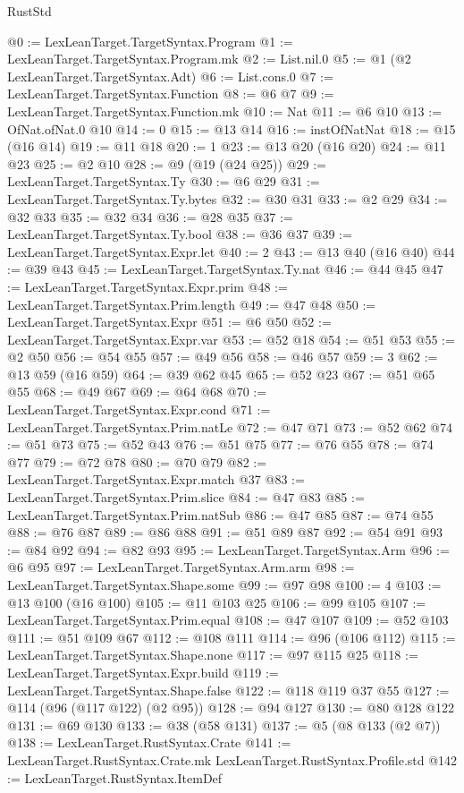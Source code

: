 \begin{lexlean}{RustStd}
\begin{coremodule}
@0 := LexLeanTarget.TargetSyntax.Program
@1 := LexLeanTarget.TargetSyntax.Program.mk
@2 := List.nil.{0}
@5 := @1 (@2 LexLeanTarget.TargetSyntax.Adt)
@6 := List.cons.{0}
@7 := LexLeanTarget.TargetSyntax.Function
@8 := @6 @7
@9 := LexLeanTarget.TargetSyntax.Function.mk
@10 := Nat
@11 := @6 @10
@13 := OfNat.ofNat.{0} @10
@14 := 0
@15 := @13 @14
@16 := instOfNatNat
@18 := @15 (@16 @14)
@19 := @11 @18
@20 := 1
@23 := @13 @20 (@16 @20)
@24 := @11 @23
@25 := @2 @10
@28 := @9 (@19 (@24 @25))
@29 := LexLeanTarget.TargetSyntax.Ty
@30 := @6 @29
@31 := LexLeanTarget.TargetSyntax.Ty.bytes
@32 := @30 @31
@33 := @2 @29
@34 := @32 @33
@35 := @32 @34
@36 := @28 @35
@37 := LexLeanTarget.TargetSyntax.Ty.bool
@38 := @36 @37
@39 := LexLeanTarget.TargetSyntax.Expr.let
@40 := 2
@43 := @13 @40 (@16 @40)
@44 := @39 @43
@45 := LexLeanTarget.TargetSyntax.Ty.nat
@46 := @44 @45
@47 := LexLeanTarget.TargetSyntax.Expr.prim
@48 := LexLeanTarget.TargetSyntax.Prim.length
@49 := @47 @48
@50 := LexLeanTarget.TargetSyntax.Expr
@51 := @6 @50
@52 := LexLeanTarget.TargetSyntax.Expr.var
@53 := @52 @18
@54 := @51 @53
@55 := @2 @50
@56 := @54 @55
@57 := @49 @56
@58 := @46 @57
@59 := 3
@62 := @13 @59 (@16 @59)
@64 := @39 @62 @45
@65 := @52 @23
@67 := @51 @65 @55
@68 := @49 @67
@69 := @64 @68
@70 := LexLeanTarget.TargetSyntax.Expr.cond
@71 := LexLeanTarget.TargetSyntax.Prim.natLe
@72 := @47 @71
@73 := @52 @62
@74 := @51 @73
@75 := @52 @43
@76 := @51 @75
@77 := @76 @55
@78 := @74 @77
@79 := @72 @78
@80 := @70 @79
@82 := LexLeanTarget.TargetSyntax.Expr.match @37
@83 := LexLeanTarget.TargetSyntax.Prim.slice
@84 := @47 @83
@85 := LexLeanTarget.TargetSyntax.Prim.natSub
@86 := @47 @85
@87 := @74 @55
@88 := @76 @87
@89 := @86 @88
@91 := @51 @89 @87
@92 := @54 @91
@93 := @84 @92
@94 := @82 @93
@95 := LexLeanTarget.TargetSyntax.Arm
@96 := @6 @95
@97 := LexLeanTarget.TargetSyntax.Arm.arm
@98 := LexLeanTarget.TargetSyntax.Shape.some
@99 := @97 @98
@100 := 4
@103 := @13 @100 (@16 @100)
@105 := @11 @103 @25
@106 := @99 @105
@107 := LexLeanTarget.TargetSyntax.Prim.equal
@108 := @47 @107
@109 := @52 @103
@111 := @51 @109 @67
@112 := @108 @111
@114 := @96 (@106 @112)
@115 := LexLeanTarget.TargetSyntax.Shape.none
@117 := @97 @115 @25
@118 := LexLeanTarget.TargetSyntax.Expr.build
@119 := LexLeanTarget.TargetSyntax.Shape.false
@122 := @118 @119 @37 @55
@127 := @114 (@96 (@117 @122) (@2 @95))
@128 := @94 @127
@130 := @80 @128 @122
@131 := @69 @130
@133 := @38 (@58 @131)
@137 := @5 (@8 @133 (@2 @7))
@138 := LexLeanTarget.RustSyntax.Crate
@141 := LexLeanTarget.RustSyntax.Crate.mk LexLeanTarget.RustSyntax.Profile.std
@142 := LexLeanTarget.RustSyntax.ItemDef

\end{coremodule}
\end{lexlean}
